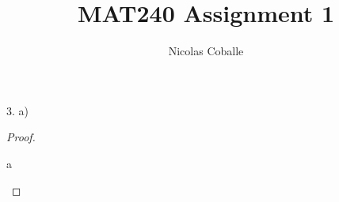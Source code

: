\documentclass[11pt]{article}
\title{MAT240 Assignment 1}
\author{Nicolas Coballe}
\newcommand{\bproof}{\begin{proof}
$ $ \\
\begin{adjustwidth}{3em}{0pt}
}
\newcommand{\eproof}{\end{adjustwidth}
\end{proof}}
\begin{document}
\maketitle
\begin{flushleft}

3. a) \bigskip \newline

\bproof

a

\eproof

\end{flushleft}
\end{document}
